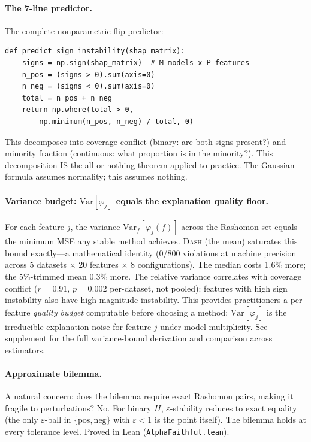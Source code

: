 \documentclass{article}
\newcommand{\Var}{\mathrm{Var}}
\newcommand{\DASH}{\textsc{Dash}}
\begin{document}
\paragraph{The 7-line predictor.}
The complete nonparametric flip predictor:

{\small
\begin{verbatim}
def predict_sign_instability(shap_matrix):
    signs = np.sign(shap_matrix)  # M models x P features
    n_pos = (signs > 0).sum(axis=0)
    n_neg = (signs < 0).sum(axis=0)
    total = n_pos + n_neg
    return np.where(total > 0,
        np.minimum(n_pos, n_neg) / total, 0)
\end{verbatim}
}

\noindent This decomposes into coverage conflict (binary: are both signs present?) and minority fraction (continuous: what proportion is in the minority?). This decomposition IS the all-or-nothing theorem applied to practice. The Gaussian formula assumes normality; this assumes nothing.

\paragraph{Variance budget: $\Var[\varphi_j]$ equals the explanation quality floor.}
For each feature $j$, the variance $\Var_f[\varphi_j(f)]$ across the Rashomon set equals the minimum MSE any stable method achieves. \DASH{} (the mean) saturates this bound exactly---a mathematical identity (0/800 violations at machine precision across 5 datasets $\times$ 20 features $\times$ 8 configurations). The median costs 1.6\% more; the 5\%-trimmed mean 0.3\% more. The relative variance correlates with coverage conflict ($r = 0.91$, $p = 0.002$ per-dataset, not pooled): features with high sign instability also have high magnitude instability. This provides practitioners a per-feature \emph{quality budget} computable before choosing a method: $\Var[\varphi_j]$ is the irreducible explanation noise for feature $j$ under model multiplicity. See supplement for the full variance-bound derivation and comparison across estimators.

\paragraph{Approximate bilemma.}
A natural concern: does the bilemma require exact Rashomon pairs, making it fragile to perturbations? No. For binary $H$, $\varepsilon$-stability reduces to exact equality (the only $\varepsilon$-ball in $\{\text{pos}, \text{neg}\}$ with $\varepsilon < 1$ is the point itself). The bilemma holds at every tolerance level. Proved in Lean (\texttt{AlphaFaithful.lean}).
\end{document}
